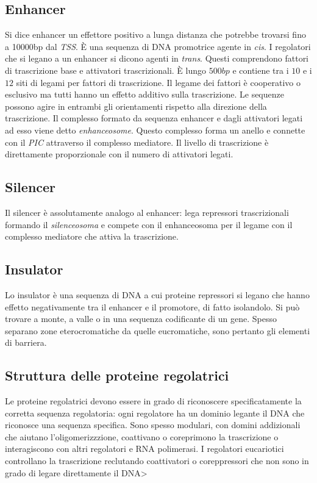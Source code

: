 \subsection{Enhancer}
Si dice enhancer un effettore positivo a lunga distanza che potrebbe trovarsi fino a \num{10000}\si{bp} dal \emph{TSS}. \`E una sequenza di DNA promotrice agente in \emph{cis}. I 
regolatori che si legano a un enhancer si dicono agenti in \emph{trans}. Questi comprendono fattori di trascrizione base e attivatori trascrizionali. \`E lungo $500bp$ e contiene 
tra i $10$ e i $12$ siti di legami per fattori di trascrizione. Il legame dei fattori \`e cooperativo o esclusivo ma tutti hanno un effetto additivo sulla trascrizione. Le sequenze 
possono agire in entrambi gli orientamenti rispetto alla direzione della trascrizione. Il complesso formato da sequenza enhancer e dagli attivatori legati ad esso viene detto 
\emph{enhanceosome}. Questo complesso forma un anello e connette con il \emph{PIC} attraverso il complesso mediatore. Il livello di trascrizione \`e direttamente proporzionale con 
il numero di attivatori legati. 
\subsection{Silencer}
Il silencer \`e assolutamente analogo al enhancer: lega repressori trascrizionali formando il \emph{silenceosoma} e compete con il enhanceosoma per il legame con il complesso 
mediatore che attiva la trascrizione.
\subsection{Insulator}
Lo insulator \`e una sequenza di DNA a cui proteine repressori si legano che hanno effetto negativamente tra il enhancer e il promotore, di fatto isolandolo. Si pu\`o trovare
a monte, a valle o in una sequenza codificante di un gene. Spesso separano zone eterocromatiche da quelle eucromatiche, sono pertanto gli elementi di barriera. 
\subsection{Struttura delle proteine regolatrici}
Le proteine regolatrici devono essere in grado di riconoscere specificatamente la corretta sequenza regolatoria: ogni regolatore ha un dominio legante il DNA che riconosce una sequenza
specifica. Sono spesso modulari, con domini addizionali che aiutano l'oligomerizzzione, coattivano o coreprimono la trascrizione o interagiscono con altri regolatori e RNA polimerasi. 
I regolatori eucariotici controllano la trascrizione reclutando coattivatori o coreppressori che non sono in grado di legare direttamente il DNA> 
